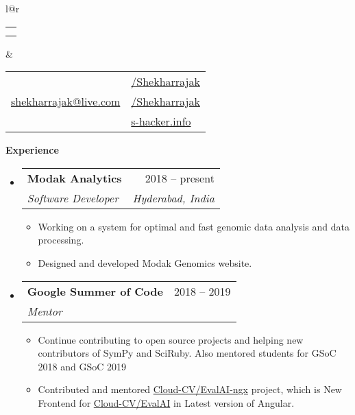 \documentclass[letterpaper,12pt]{article}[leftmargin=*]
\makeatletter
\def \fullname {Shekhar Prasad Rajak}
\def \subtitle {}
\def \linkedinicon {\faLinkedin}
\def \linkedinlink {https://www.linkedin.com/in/shekhar-prasad-rajak-9988b626/}
\def \linkedintext {/Shekharrajak}
\def \phoneicon {\faPhone}
\def \phonetext {+91-8142478937}
\def \emailicon {\faEnvelope}
\def \emaillink {mailto:shekharrajak@live.com}
\def \emailtext {shekharrajak@live.com}
\def \githubicon {\faGithub}
\def \githublink {https://github.com/Shekharrajak}
\def \githubtext {/Shekharrajak}
\def \websiteicon {\faGlobe}
\def \websitelink {http://s-hacker.info/}
\def \websitetext {s-hacker.info}
\def \headertype {\doublecol} %
\def \entryspacing {-0pt}
\def \linkedin {\linkedinicon \hspace{3pt}\href{\linkedinlink}{\linkedintext}}
\def \phone {\phoneicon \hspace{3pt}{ \phonetext}}
\def \email {\emailicon \hspace{3pt}\href{\emaillink}{\emailtext}}
\def \github {\githubicon \hspace{3pt}\href{\githublink}{\githubtext}}
\def \website {\websiteicon \hspace{3pt}\href{\websitelink}{\websitetext}}
\renewcommand{\section}[2]{\vspace{5pt}
  \colorbox{secondary}{\color{white}\raggedbottom\normalsize\textbf{{#1}{\hspace{7pt}#2}}}
}
\newcommand{\resumeEntryStart}{\begin{itemize}[leftmargin=2.5mm]}
\newcommand{\resumeEntryEnd}{\end{itemize}\vspace{\entryspacing}}
\newcommand{\resumeItemListStart}{\begin{itemize}[leftmargin=4.5mm]}
\newcommand{\resumeItemListEnd}{\end{itemize}}
\newcommand{\resumeItem}[1]{
  \item\small{
    {#1 \vspace{-2pt}}
  }
}
\newcommand{\resumeEntryTSDL}[4]{
  \vspace{-1pt}\item[]
    \begin{tabular*}{0.97\textwidth}{l@{\extracolsep{\fill}}r}
      \textbf{\color{primary}#1} & {\firabook\color{accent}\small#2} \\
      \textit{\color{accent}\small#3} & \textit{\color{accent}\small#4} \\
    \end{tabular*}\vspace{-6pt}
}
\newcommand{\doublecol}[6]{
  \begin{tabular*}{\textwidth}{l@{\extracolsep{\fill}}r}
    {
      \begin{tabular}[c]{l}
        \fontsize{25}{25}\selectfont{\color{primary}{{\textbf{\fullname}}}} \\
        {\textit{\subtitle}} %
      \end{tabular}
    } & {
      \begin{tabular}[c]{l@{\hspace{1.5em}}l}
        {\small#4} & {\small#1} \\
        {\small#5} & {\small#2} \\
        {\small#6} & {\small#3}
      \end{tabular}
    }
  \end{tabular*}
}
\newcommand{\singlecol}[6]{
  \begin{tabular*}{\textwidth}{l@{\extracolsep{\fill}}r}
    {
      \begin{tabular}[b]{l}
        \fontsize{35}{45}\selectfont{\color{primary}{{\textbf{\fullname}}}} \\
        {\textit{\subtitle}} %
      \end{tabular}
    } & {
      \begin{tabular}[c]{l}
        {\small#1} \\
        {\small#2} \\
        {\small#3} \\
        {\small#4} \\
        {\small#5} \\
        {\small#6}
      \end{tabular}
    }
  \end{tabular*}
}
\makeatother
\begin{document}


\headertype{\linkedin}{\github}{\website}{\phone}{\email}{} %
\vspace{-10pt} %



\section{\faPieChart}{Experience}

  \resumeEntryStart
    \resumeEntryTSDL
      {Modak Analytics}{2018 -- present}
      {Software Developer}{Hyderabad, India}
    \resumeItemListStart
      \resumeItem {Working on a system for optimal and fast genomic data analysis and
data processing.}
      \resumeItem {Designed and developed Modak Genomics website.}
    \resumeItemListEnd
  \resumeEntryEnd

   \resumeEntryStart
    \resumeEntryTSDL
      {Google Summer of Code}{2018 -- 2019}
      {Mentor}{}
    \resumeItemListStart
      \resumeItem {Continue contributing to open source projects and helping new contributors of SymPy and SciRuby. Also mentored students for GSoC 2018 and GSoC 2019}
      \resumeItem {Contributed and mentored \href{https://github.com/Cloud-CV/EvalAI-ngx}{Cloud-CV/EvalAI-ngx} project, which is New Frontend for \href{https://github.com/Cloud-CV/EvalAI}{Cloud-CV/EvalAI} in Latest version of Angular.}
    \resumeItemListEnd
  \resumeEntryEnd
\end{document}
